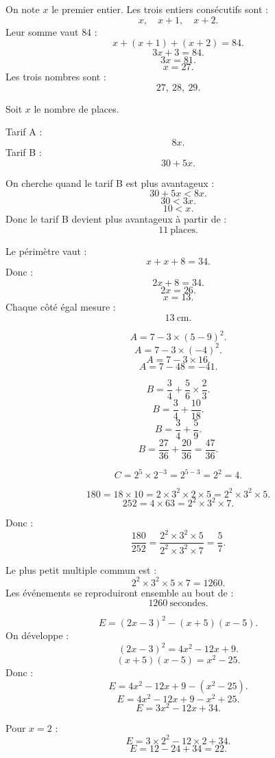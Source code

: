 \documentclass[11pt,a4paper]{article}
\newcounter{correction}
\newcommand{\encadre}[1]{\boxed{\displaystyle #1}}
\begin{document}
\begin{correction}
On note $x$ le premier entier. Les trois entiers consécutifs sont :
\[
x,\quad x+1,\quad x+2.
\]
Leur somme vaut $84$ :
\[
x+(x+1)+(x+2)=84.
\]
\[
3x+3=84.
\]
\[
3x=81.
\]
\[
x=27.
\]
Les trois nombres sont :
\[
\encadre{27,\ 28,\ 29}.
\]
\end{correction}

\begin{correction}
Soit $x$ le nombre de places.

Tarif A :
\[
8x.
\]
Tarif B :
\[
30+5x.
\]

On cherche quand le tarif B est plus avantageux :
\[
30+5x<8x.
\]
\[
30<3x.
\]
\[
10<x.
\]
Donc le tarif B devient plus avantageux à partir de :
\[
\encadre{11\ \text{places}}.
\]
\end{correction}

\begin{correction}
Le périmètre vaut :
\[
x+x+8=34.
\]
Donc :
\[
2x+8=34.
\]
\[
2x=26.
\]
\[
x=13.
\]
Chaque côté égal mesure :
\[
\encadre{13\ \text{cm}}.
\]
\end{correction}

\begin{correction}
\[
A=7-3\times(5-9)^2.
\]
\[
A=7-3\times(-4)^2.
\]
\[
A=7-3\times16.
\]
\[
A=7-48=-41.
\]

\[
B=\frac{3}{4}+\frac{5}{6}\times\frac{2}{3}.
\]
\[
B=\frac{3}{4}+\frac{10}{18}.
\]
\[
B=\frac{3}{4}+\frac{5}{9}.
\]
\[
B=\frac{27}{36}+\frac{20}{36}=\frac{47}{36}.
\]

\[
C=2^5\times2^{-3}=2^{5-3}=2^2=4.
\]
\end{correction}

\begin{correction}
\[
180=18\times10=2\times3^2\times2\times5=2^2\times3^2\times5.
\]
\[
252=4\times63=2^2\times3^2\times7.
\]

Donc :
\[
\frac{180}{252}
=
\frac{2^2\times3^2\times5}{2^2\times3^2\times7}
=
\frac{5}{7}.
\]

Le plus petit multiple commun est :
\[
2^2\times3^2\times5\times7=1260.
\]
Les événements se reproduiront ensemble au bout de :
\[
\encadre{1260\ \text{secondes}}.
\]
\end{correction}

\begin{correction}
\[
E=(2x-3)^2-(x+5)(x-5).
\]
On développe :
\[
(2x-3)^2=4x^2-12x+9.
\]
\[
(x+5)(x-5)=x^2-25.
\]
Donc :
\[
E=4x^2-12x+9-(x^2-25).
\]
\[
E=4x^2-12x+9-x^2+25.
\]
\[
E=3x^2-12x+34.
\]

Pour $x=2$ :
\[
E=3\times2^2-12\times2+34.
\]
\[
E=12-24+34=22.
\]
\end{correction}
\end{document}
